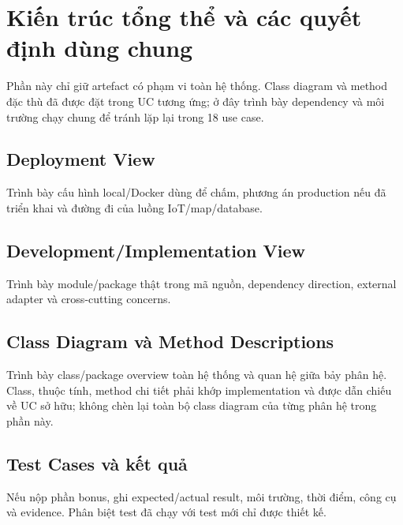 \section{Kiến trúc tổng thể và các quyết định dùng chung}

Phần này chỉ giữ artefact có phạm vi toàn hệ thống. Class diagram và method đặc thù đã được đặt trong UC tương ứng; ở đây trình bày dependency và môi trường chạy chung để tránh lặp lại trong 18 use case.

\subsection{Deployment View}
Trình bày cấu hình local/Docker dùng để chấm, phương án production nếu đã triển khai và đường đi của luồng IoT/map/database.

\subsection{Development/Implementation View}
Trình bày module/package thật trong mã nguồn, dependency direction, external adapter và cross-cutting concerns.

\subsection{Class Diagram và Method Descriptions}
Trình bày class/package overview toàn hệ thống và quan hệ giữa bảy phân hệ. Class, thuộc tính, method chi tiết phải khớp implementation và được dẫn chiếu về UC sở hữu; không chèn lại toàn bộ class diagram của từng phân hệ trong phần này.

\subsection{Test Cases và kết quả}
Nếu nộp phần bonus, ghi expected/actual result, môi trường, thời điểm, công cụ và evidence. Phân biệt test đã chạy với test mới chỉ được thiết kế.
